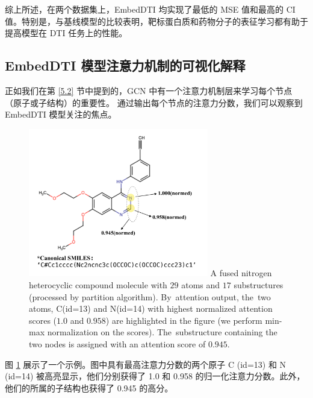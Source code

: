 综上所述，在两个数据集上，EmbedDTI 均实现了最低的 MSE 值和最高的 CI 值。特别是，与基线模型的比较表明，靶标蛋白质和药物分子的表征学习都有助于提高模型在 DTI 任务上的性能。

\subsection{EmbedDTI 模型注意力机制的可视化解释}

正如我们在第 \ref{5.2} 节中提到的，GCN 中有一个注意力机制层来学习每个节点（原子或子结构）的重要性。 通过输出每个节点的注意力分数，我们可以观察到 EmbedDTI 模型关注的焦点。

\begin{figure}[!htbp] 
\centering
\includegraphics[width=0.7\textwidth]  {imgs/attention.png}
{A fused nitrogen heterocyclic compound molecule with $29$ atoms and $17$ substructures (processed by partition algorithm). By~attention output, the~two atoms, C(id=13) and N(id=14) with highest normalized attention scores ($1.0$ and $0.958$) are highlighted in the figure (we perform min-max normalization on the scores). The~substructure containing the two nodes is assigned with an attention score of $0.945$.}
\label{fig:att}
\end{figure}

图 \ref{fig:att} 展示了一个示例。图中具有最高注意力分数的两个原子 C (id=13) 和 N (id=14) 被高亮显示，他们分别获得了 1.0 和 0.958 的归一化注意力分数。此外，他们的所属的子结构也获得了 0.945 的高分。

